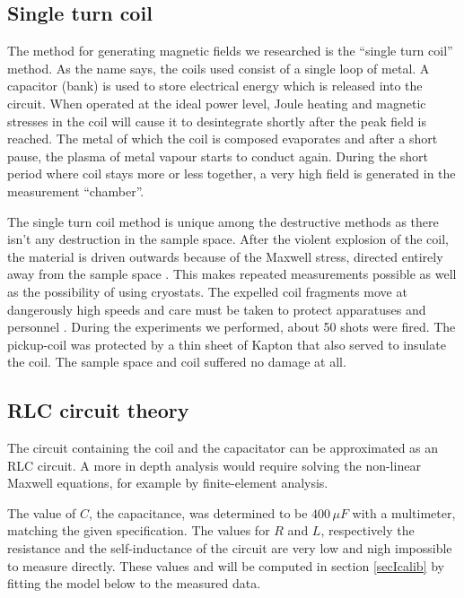 \subsection{Single turn coil}

The method for generating magnetic fields we researched is the ``single 
turn coil'' method. As the name says, the coils used consist of a single 
loop of metal. A capacitor (bank) is used to store electrical energy which 
is released into the circuit. When operated at the ideal power level, Joule 
heating and magnetic stresses in the coil will cause it to desintegrate 
shortly after the peak field is reached. The metal of which the coil is 
composed evaporates  and after a short pause, the plasma of metal vapour 
starts to conduct again. During the short period where coil stays more or 
less together, a very high field is generated in the measurement 
``chamber''. 

The single turn coil method is unique among the destructive methods as 
there isn't any destruction in the sample space. After the violent 
explosion of the coil, the material is driven outwards because of the 
Maxwell stress, directed entirely away from the sample space 
\cite{herlachArticle}.  This makes repeated measurements possible as well 
as the possibility of using cryostats. The expelled coil fragments move at 
dangerously high speeds and care must be taken to protect apparatuses and 
personnel \cite{singleTurn}. During the experiments we performed, about 50 
shots were fired. The pickup-coil was protected by a thin sheet of Kapton 
that also served to insulate the coil. The sample space and coil suffered 
no damage at all.

\subsection{RLC circuit theory}

The circuit containing the coil and the capacitator can be approximated as an 
RLC circuit. A more in depth analysis would require solving the non-linear 
Maxwell equations, for example by finite-element 
analysis.\cite{herlachArticle}

The value of $C$, the capacitance, was determined to be $400\,\mu F$ with a 
multimeter, matching the given specification. The values for $R$ and $L$, 
respectively the resistance and the self-inductance of the circuit are very low 
and nigh impossible to measure directly. These values and will be computed in 
section \ref{secIcalib} by fitting the model below to the measured data.

